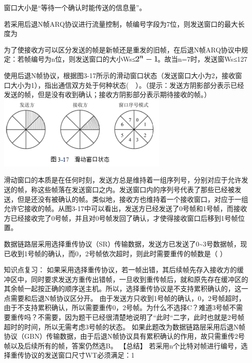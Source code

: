 \begin{solution}窗口大小是``等待一个确认时能传送的信息量''。
\end{solution}
\question 若采用后退N帧ARQ协议进行流量控制，帧编号字段为7位，则发送窗口的最大长度为
\par{}
\begin{solution}为了使接收方可以区分发送的帧是新帧还是重发的旧帧，在后退N帧ARQ协议中规定：若帧编号为n位，则发送窗口的大小Ws≤\includegraphics[width=0.46875in,height=0.13542in]{texmath/9438eb5Cdpi7B3507D25En-1}。故当n=7时，发送窗Ws≤127
\end{solution}
\question 使用后退N帧协议，根据图3-17所示的滑动窗口状态（发送窗口大小为2，接收窗口大小为1），指出通信双方处于何种状态(　）。（提示：发送方阴影部分表示已经发送的帧，但是没有收到确认；接收方阴影部分表示期待接收的帧。）
\includegraphics[width=3.33333in,height=1.43750in]{computerassets/36D7EBAA3994386EFBA3FD7C902040C5.png}
\par{}
\begin{solution}滑动窗口的本质是在任何时刻，发送方总是维持着一组序列号，分别对应于允许发送的帧，称这些帧落在发送窗口之内。发送窗口内的序列号代表了那些已经被发送，但是还没有被确认的帧。类似地，接收方也维持着一个接收窗口，对应于一组允许它接收的帧。从图3-17中可以看出，发送方已经发送了0号帧和1号帧，而接收方已经接收完了0号帧，并且对0号帧发回了确认，才使得接收窗口后移到1号帧位置。
\end{solution}
\question 数据链路层采用选择重传协议（SR）传输数据，发送方已发送了0\textasciitilde{}3号数据帧，现已收到1号帧的确认，而0，2号帧依次超时，则此时需要重传的帧数是（
）
\par{}
\begin{solution}知识点复习：
如果采用选择重传协议，若一帧出错，其后续帧先存入接收方的缓冲区中，同时要求发送方重传出错帧，一旦收到重传帧后，就和原先存在缓冲区的其余帧一起按正确的顺序送主机。所以，选择重传协议是不支持累积确认的，这一点需要和后退N帧协议区分开。
由于发送方只收到1号帧的确认，0，2号帧超时，由于不支持累积确认，所以需要重传0，2号帧。为什么不选择C？难道3号帧不需要重传吗？不需要，因为题干已经很清楚地说明了``此时``二字，此时也就是2号帧超时的时间，所以无需考虑3号帧的状态。
如果此题改为数据链路层采用后退N帧协议（GBN）传输数据，由于后退N帧协议具有累积确认的作用，故只需重传2号帧以及后续所有的帧，答案仍然选B。
【总结】
若采用n个比特对帧进行编号，选择重传协议的发送窗口尺寸WT必须满足：1
\end{solution}
